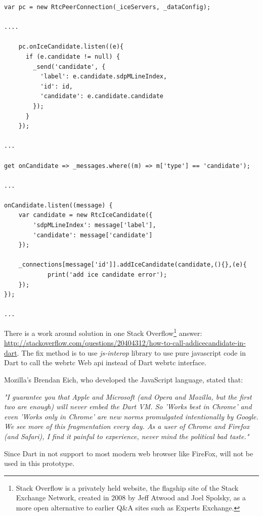 \begin{lstlisting}[caption={Add IceCandidate in Dart},label={code:dart_add_ice}]
var pc = new RtcPeerConnection(_iceServers, _dataConfig);

....

    pc.onIceCandidate.listen((e){
      if (e.candidate != null) {
        _send('candidate', {
          'label': e.candidate.sdpMLineIndex,
          'id': id,
          'candidate': e.candidate.candidate
        });
      }
    });
    
...

get onCandidate => _messages.where((m) => m['type'] == 'candidate');

...

onCandidate.listen((message) {
	var candidate = new RtcIceCandidate({
		'sdpMLineIndex': message['label'],
        'candidate': message['candidate']
    });

    _connections[message['id']].addIceCandidate(candidate,(){},(e){
    		print('add ice candidate error');
    });
});

...
\end{lstlisting}

\par There is a work around solution in one Stack Overflow\footnote{Stack Overflow is a privately held website, the flagship site of the Stack Exchange Network, created in 2008 by Jeff Atwood and Joel Spolsky, as a more open alternative to earlier Q\&A sites such as Experts Exchange.} answer: \url{http://stackoverflow.com/questions/20404312/how-to-call-addicecandidate-in-dart}. The fix method is to use \textit{js-interop} library to use pure javascript code in Dart to call the \gls{webrtc} Web \gls{api} instead of Dart \gls{webrtc} interface.
\par Mozilla's Brendan Eich, who developed the JavaScript language, stated that:

\textit{"I guarantee you that Apple and Microsoft (and Opera and Mozilla, but the first two are enough) will never embed the Dart VM. So 'Works best in Chrome' and even 'Works only in Chrome' are new norms promulgated intentionally by Google. We see more of this fragmentation every day. As a user of Chrome and Firefox (and Safari), I find it painful to experience, never mind the political bad taste."}\cite{wiki:dart}

\par Since Dart in not support to most modern web browser like FireFox, will not be used in this prototype.

